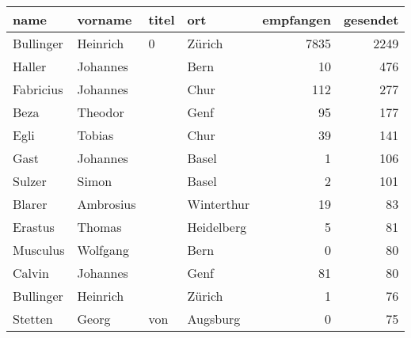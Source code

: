 \begin{tabular}{llllrr}
\toprule
                     name &                            vorname &       titel &                                         ort &  empfangen &  gesendet \\
\midrule
                Bullinger &                           Heinrich &           0 &                                      Zürich &       7835 &      2249 \\
                   Haller &                           Johannes &             &                                        Bern &         10 &       476 \\
                Fabricius &                           Johannes &             &                                        Chur &        112 &       277 \\
                     Beza &                            Theodor &             &                                        Genf &         95 &       177 \\
                     Egli &                             Tobias &             &                                        Chur &         39 &       141 \\
                     Gast &                           Johannes &             &                                       Basel &          1 &       106 \\
                   Sulzer &                              Simon &             &                                       Basel &          2 &       101 \\
                   Blarer &                          Ambrosius &             &                                  Winterthur &         19 &        83 \\
                  Erastus &                             Thomas &             &                                  Heidelberg &          5 &        81 \\
                 Musculus &                           Wolfgang &             &                                        Bern &          0 &        80 \\
                   Calvin &                           Johannes &             &                                        Genf &         81 &        80 \\
                Bullinger &                           Heinrich &             &                                      Zürich &          1 &        76 \\
                  Stetten &                              Georg &         von &                                    Augsburg &          0 &        75 \\

\end{tabular}
